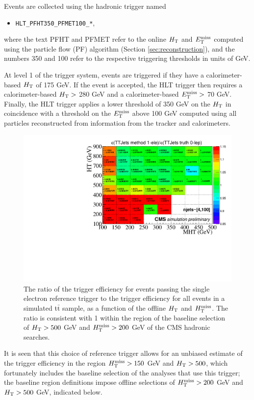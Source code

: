 Events are collected using the hadronic trigger named
\begin{itemize}
  \item \texttt{HLT\_PFHT350\_PFMET100\_*},
\end{itemize}
where the text PFHT and PFMET refer to the online $H_{\rm T}$ and $E_{\text{T}}^{\rm miss}$ computed using the particle flow (PF) algorithm (Section \ref{sec:reconstruction}), and the numbers 350 and 100 refer to the respective triggering thresholds in units of GeV.

At level 1 of the trigger system, events are triggered if they have a calorimeter-based $H_{\rm T}$ of 175 GeV. If the event is accepted, the HLT trigger then requires a calorimeter-based $H_{\rm T}>$ 280 GeV and a calorimeter-based $E_{\text{T}}^{\rm miss}>$ 70 GeV. Finally, the HLT trigger applies a lower threshold of 350 GeV on the $H_{\rm T}$ in coincidence with a threshold on the $E_{\text{T}}^{\rm miss}$ above 100 GeV computed using all particles reconstructed from information from the tracker and calorimeters.

\begin{figure}[tb!]
  \begin{center}
    \includegraphics[width=0.95\linewidth]{figures/trigger/EfficiencyRatioMethodTruth.pdf}
    \caption{
      The ratio of the trigger efficiency for events passing the single
      electron reference trigger to the trigger efficiency for all
      events in a simulated t$\bar{\text{t}}$ sample, as a function of the offline $H_{\rm T}$
      and $H_{\text{T}}^{\rm miss}$. The ratio is consistent with 1 within the region of
      the baseline selection of $H_{\rm T}>500$ GeV and $H_{\text{T}}^{\rm miss}>200$ GeV of the CMS hadronic searches.
    }
    \label{fig:2dEffRatio}
  \end{center}
\end{figure}
It is seen that this choice of reference trigger allows for an unbiased estimate of the trigger efficiency in the region $H_{\text{T}}^{\rm miss}>150$ GeV and $H_{\rm T}>500$, which fortunately includes the baseline selection of the analyses that use this trigger; the baseline region definitions impose offline selections of $H_{\text{T}}^{\rm miss}>200$ GeV and $H_{\rm T}>500$ GeV, indicated below. 

